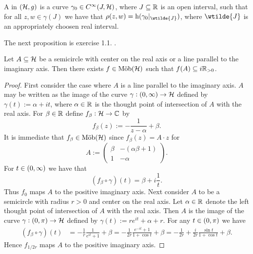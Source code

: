 \begin{definition}[Geodesics]
	A  in $(\mathcal{H},g)$ is a curve $\gamma_0 \in C^\infty(J,\mathcal{H})$, where $J \subseteq \mathbb{R}$ is an open interval, such that for all $z,w \in \gamma(J)$ we have that $\rho(z,w) = \h(\gamma_0\vert_{\wtilde{J}})$, where $\wtilde{J}$ is an appropriately choosen real interval.
\end{definition}

The next proposition is exercise 1.1. \cite[21]{katok:Fuchsian_groups:1992}.

\begin{proposition}
	Let $A \subseteq \mathcal{H}$ be a semicircle with center on the real axis or a line parallel to the imaginary axis. Then there exists $f \in \mathrm{M\ddot{o}b}(\mathcal{H})$ such that $f(A) \subseteq i\mathbb{R}_{>0}$.
	\label{prop:mapping_to_imaginary_axis}
\end{proposition}

\begin{proof}
	First consider the case where $A$ is a line parallel to the imaginary axis. $A$ may be written as the image of the curve $\gamma : \intoo{0,\infty} \to \Hcal$ defined by $\gamma(t) := \alpha + it$, where $\alpha \in \mathbb{R}$ is the thought point of intersection of $A$ with the real axis. For $\beta \in \mathbb{R}$ define $f_\beta : \mathcal{H} \to \mathbb{C}$ by
	\begin{equation}
		f_\beta(z) := -\frac{1}{z - \alpha} + \beta. 	
	\end{equation}
	It is immediate that $f_\beta \in \mathrm{M\ddot{o}b}(\mathcal{H})$ since $f_\beta(z) = A \cdot z$ for 
	\begin{equation*}
		A := \begin{pmatrix}
			\beta & - (\alpha\beta + 1)\\
			1 & -\alpha
		\end{pmatrix}.
	\end{equation*}
	For $t \in \intoo{0,\infty}$ we have that
	\begin{equation*}
		(f_\beta \circ \gamma)(t) = \beta + i\frac{1}{t}.
	\end{equation*}
	Thus $f_0$ maps $A$ to the positive imaginary axis. Next consider $A$ to be a semicircle with radius $r > 0$ and center on the real axis. Let $\alpha \in \mathbb{R}$ denote the left thought point of intersection of $A$ with the real axis. Then $A$ is the image of the curve $\gamma : \intoo{0,\pi} \to \Hcal$ defined by $\gamma(t) := re^{it} + \alpha + r$. For any $t \in \intoo{0,\pi}$ we have 
	\begin{align*}
		(f_\beta \circ \gamma)(t) &= -\frac{1}{r}\frac{1}{e^{it} + 1} + \beta = -\frac{1}{2r}\frac{e^{-it} + 1}{1 + \cos t} + \beta = -\frac{1}{2r} + \frac{i}{2r} \frac{\sin t}{1 + \cos t} + \beta.
	\end{align*}
	Hence $f_{1/2r}$ maps $A$ to the positive imaginary axis.
\end{proof}

